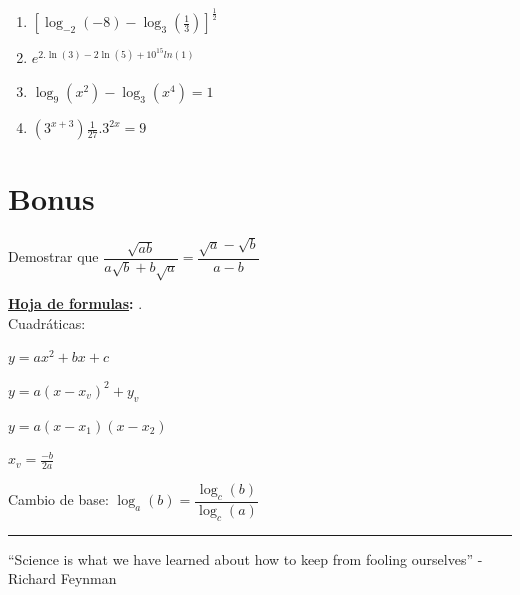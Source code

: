 \documentclass[a4paper,11pt,spanish,sans]{exam}
\begin{document}
	\begin{enumerate}
		
		\item $[\log_{-2}(-8)-\log_3(\frac{1}{3})]^{\frac{1}{2}}$
		\item $e^{2.\ln(3)-2\ln(5)+10^{15}ln(1)}$
		\item $\log_9(x^2)-\log_3(x^4)=1$
		\item $(3^{x+3})\frac{1}{27}.3^{2x}=9 $
	\end{enumerate}

\section{Bonus}
	Demostrar que 
	$\dfrac{\sqrt{ab}}{a\sqrt{b}+b\sqrt{a}}=\dfrac{\sqrt{a}-\sqrt{b}}{a-b}$
	
	
	\textbf{\underline{Hoja de formulas}:} . \\
	
	Cuadráticas:
	
	$y=ax^2+bx+c$
	
	$y=a(x-x_v)^2+y_v$
	
	$y=a(x-x_1)(x-x_2)$
	
	$x_v=\frac{-b}{2a}$
	
	Cambio de base: $\log_a(b)=\dfrac{\log_c(b)}{\log_c(a)}$

\rule[2ex]{\textwidth}{1pt}

“Science is what we have learned about how to keep from fooling ourselves”   -Richard Feynman 

\end{document}
